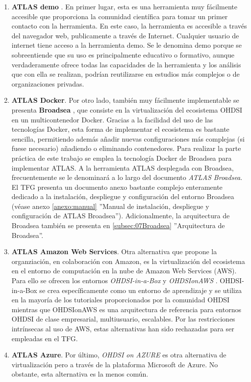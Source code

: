 \begin{enumerate}[label=\alph*.]

    \item \textbf{ATLAS demo} \cite{ATLASdemo}. En primer lugar, esta es una herramienta muy fácilmente accesible que proporciona la comunidad científica para tomar un primer contacto con la herramienta. En este caso, la herramienta es accesible a través del navegador web, publicamente a través de Internet. Cualquier usuario de internet tiene acceso a la herramienta demo. Se le denomina demo porque se sobreentiende que su uso es principalmente educativo o formativo, aunque verdaderamente ofrece todas las capacidades de la herramienta y los análisis que con ella se realizan, podrían reutilizarse en estudios más complejos o de organizaciones privadas.

    \item \textbf{ATLAS Docker}. Por otro lado, también muy fácilmente implementable se presenta \textbf{Broadsea} \cite{githubBroadsea}, que consiste en la virtualización del ecosistema OHDSI en un multicontenedor Docker. Gracias a la facilidad del uso de las tecnologías Docker, esta forma de implementar el ecosistema es bastante sencilla, permitiendo además añadir nuevas configuraciones más complejas (si fuese necesario) añadiendo o eliminando contenedores. Para realizar la parte práctica de este trabajo se emplea la tecnología Docker de Broadsea para implementar ATLAS. A la herramienta ATLAS desplegada con Broadsea, frecuentemente se le denominará a lo largo del documento \textit{ATLAS Broadsea}. El TFG presenta un documento anexo bastante complejo enteramente dedicado a la instalación, despliegue y configuración del entorno Broadsea (véase anexo \ref{anexo:manual} ''Manual de instalación, despliegue y configuración de ATLAS Broadsea''). Adicionalmente, la arquitectura de Broadsea también se presenta en \ref{subsec:07Broadsea} ''Arquitectura de Broadsea''.

    \item \textbf{ATLAS Amazon Web Services}. Otra alternativa que propone la organziación, en colaboración con Amazon, es la virtualización del ecosistema en el entorno de computación en la nube de Amazon Web Services (AWS). Para ello se ofrecen los entornos \textit{OHDSI-in-a-Box} \cite{githubOHDSIBox} y \textit{OHDSIonAWS} \cite{githubOHDSIAWS}. OHDSI-in-a-Box se crea específicamente como un entorno de aprendizaje y se utiliza en la mayoría de los tutoriales proporcionados por la comunidad OHDSI mientras que OHDSIonAWS es una arquitectura de referencia para entornos OHDSI de clase empresarial, multiusuario, escalables. Por las restricciones intrínsecas al uso de AWS, estas alternativas han sido rechazadas para ser empleadas en el TFG.
    
    \item \textbf{ATLAS Azure}. Por último, \textit{OHDSI on AZURE} \cite{OHDSIonAzure} es otra alternativa de virtualización pero a través de la plataforma Microsoft de Azure. No obstante, esta alternativa es la menos común.
    
\end{enumerate}

